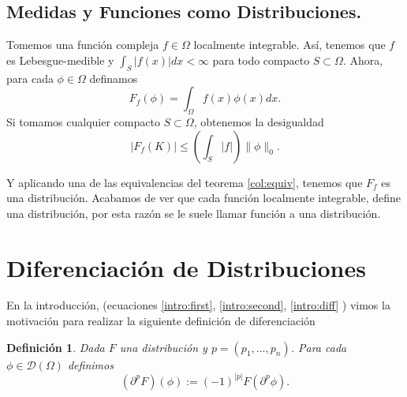 \documentclass[letter,12pt]{article}
\newcommand\norm[1]{\lVert#1\rVert}
\newtheorem{definition}[theorem]{Definición}
\begin{document}
\subsection{Medidas y Funciones como Distribuciones.}
Tomemos una función compleja $ f\in \Omega $ localmente integrable.
Así, tenemos que $ f $ es Lebesgue-medible y $ \int_{S}|f(x)|dx < \infty $
para todo compacto $ S\subset\Omega $.
Ahora, para cada $ \phi \in \Omega $ definamos
\begin{equation}
	F_{f}(\phi) = \int_{\Omega}{f(x)\phi(x)}dx.
\end{equation}
Si tomamos cualquier compacto $ S\subset \Omega $, obtenemos la desigualdad
\begin{equation}\label{key}
	|F_f(K)| \leq \left( \int_{S}|f| \right) \norm{\phi}_0.
\end{equation}

Y aplicando una de las equivalencias del teorema \ref{col:equiv}, tenemos que
$ F_f $ es una distribución.
Acabamos de ver que cada función localmente integrable, define una distribución,
por esta razón se le suele llamar función a una distribución.

\section{Diferenciación de Distribuciones}
En la introducción, (ecuaciones \eqref{intro:first}, \eqref{intro:second}, \eqref{intro:diff} )
vimos la motivación para realizar la siguiente definición de diferenciación
\begin{definition}
	Dada $ F $ una distribución y $ p=(p_1, \dots, p_n) $. Para cada 
	$ \phi \in \mathscr{D}(\Omega) $ definimos
	\begin{equation}\label{diff:def_diff}
		(\partial^p F)(\phi) := (-1)^{|p|} F(\partial^p{\phi}). 
	\end{equation} 
\end{definition}
\end{document}
